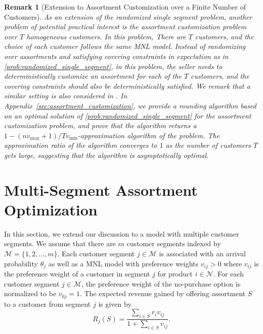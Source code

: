 \documentclass[msom,non-blindrev]{informs3} %
\newtheorem{remark}[theorem]{Remark}
\theoremstyle{definition}
\begin{document}
{  
\begin{remark}[Extension to Assortment Customization over a Finite Number of Customers]
As an extension of the randomized single segment problem, another problem of potential practical interest is the assortment customization problem over $T$ homogeneous customers. In this problem, There are $T$ customers, and the choice of each customer follows the same MNL model. Instead of randomizing over assortments and satisfying covering constraints in expectation as in \eqref{prob:randomized_single_segment}, in this problem, the seller needs to deterministically customize an assortment for each of the $T$ customers, and the covering constraints should also be deterministically satisfied. We remark that a similar setting is also considered in \cite{barre2023assortment}. In Appendix~\ref{sec:assortment_customization}, we provide a rounding algorithm based on an optimal solution of \eqref{prob:randomized_single_segment} for the assortment customization problem, and prove that the algorithm returns a $1-(nv_{\max}+1)/Tv_{\min}$-approximation algorithm of the problem. The approximation ratio of the algorithm converges to $1$ as the number of customers $T$ gets large, suggesting that the algorithm is asymptotically optimal.
\end{remark}
}

\section{Multi-Segment Assortment Optimization}\label{sec:multi_segment}

In this section, we extend our discussion to a model with multiple customer segments. We assume that there are $m$ customer segments indexed by $\mathcal{M}=\{1,2,\dots,m\}$. Each customer segment $j\in\mathcal{M}$ is associated with an arrival probability $\theta_j$ as well as a MNL model with preference weights $v_{ij}>0$  where $v_{ij}$ is the preference weight of a customer in segment $j$ for product $i\in\mathcal{N}$. For each customer segment $j\in\mathcal{M}$, the preference weight of the no-purchase option is normalized to be $v_{0j}=1$. The expected revenue gained by offering assortment $S$ to a customer from segment $j$ is given by
\begin{equation*}
R_j(S)=\dfrac{\sum_{i\in S}r_iv_{ij}}{1+\sum_{i\in S}v_{ij}}.
\end{equation*}
\end{document}

